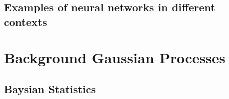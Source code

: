 	\section{Examples of neural networks in different contexts}
\chapter{Background Gaussian Processes}
	\section{Baysian Statistics}